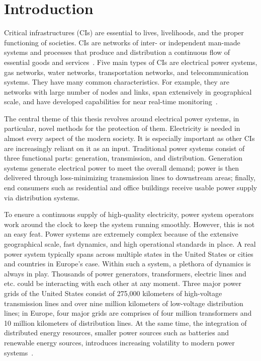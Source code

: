 
\chapter{Introduction}
\label{ch:introduction}
\vspace{2em}


Critical infrastructures (CIs) are essential to lives, livelihoods, and the proper functioning of societies. CIs are networks of inter- or independent man-made systems and processes that produce and distribution a continuous flow of essential goods and services~\cite{ellis1997report}. Five main types of CIs are electrical power systems, gas networks, water networks, transportation networks, and telecommunication systems. They have many common characteristics. For example, they are networks with large number of nodes and links, span extensively in geographical scale, and have developed capabilities for near real-time monitoring~\cite{guikema2009natural}. 

The central theme of this thesis revolves around electrical power systems, in particular, novel methods for the protection of them. Electricity is needed in almost every aspect of the modern society. It is especially important as other CIs are increasingly reliant on it as an input. Traditional power systems consist of three functional parts: generation, transmission, and distribution. Generation systems generate electrical power to meet the overall demand; power is then delivered through loss-minimizing transmission lines to downstream areas; finally, end consumers such as residential and office buildings receive usable power supply via distribution systems. 

To ensure a continuous supply of high-quality electricity, power system operators work around the clock to keep the system running smoothly. However, this is not an easy feat. Power systems are extremely complex because of the extensive geographical scale, fast dynamics, and high operational standards in place. A real power system typically spans across multiple states in the United States or cities and countries in Europe's case. Within such a system, a plethora of dynamics is always in play. Thousands of power generators, transformers, electric lines and etc. could be interacting with each other at any moment. Three major power grids of the United States consist of 275,000 kilometers of high-voltage transmission lines and over nine million kilometers of low-voltage distribution lines;  in Europe, four major grids are comprises of four million transformers and 10 million kilometers of distribution lines. At the same time, the integration of distributed energy resources, smaller power sources such as batteries and renewable energy sources, introduces increasing volatility to modern power systems~\cite{amin2008challenges}.

